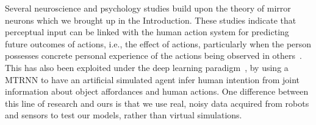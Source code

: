Several neuroscience and psychology studies build upon the theory of mirror neurons which we brought up in the Introduction. These studies indicate that perceptual input can be linked with the human action system for predicting future outcomes of actions, i.e., the effect of actions, particularly when the person possesses concrete personal experience of the actions being observed in others~\cite{aglioti:2008:basketball,knoblich:2001:psychsci}. This has also been exploited under the deep learning paradigm~\cite{kim:2017:nn}, by using a \ac{MTRNN} to have an artificial simulated agent infer human intention from joint information about object affordances and human actions. One difference between this line of research and ours is that we use real, noisy data acquired from robots and sensors to test our models, rather than virtual simulations.
